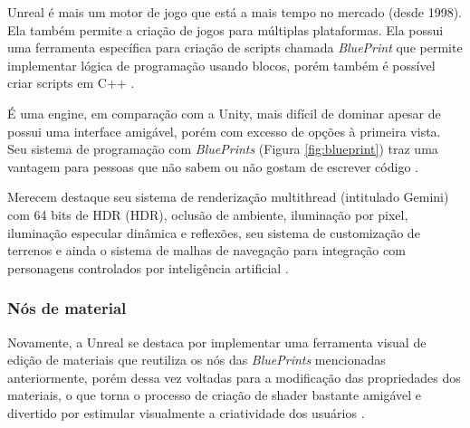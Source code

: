 Unreal é mais um motor de jogo que está a mais tempo no mercado (desde 1998). Ela também permite a criação de jogos para múltiplas plataformas. Ela possui uma ferramenta específica para criação de scripts chamada \textit{BluePrint} que permite implementar lógica de programação usando blocos, porém também é possível criar scripts em C++ \cite{compStudyGE}.

\begin{figure}[h!]
	\centering
\end{figure}
\nocite{blueprint}

É uma engine, em comparação com a Unity, mais difícil de dominar apesar de possui uma interface amigável, porém com excesso de opções à primeira vista. Seu sistema de programação com \textit{BluePrints} (Figura \ref{fig:blueprint}) traz uma vantagem para pessoas que não sabem ou não gostam de escrever código \cite{compStudyGE}.

Merecem destaque seu sistema de renderização \Gls{multithread} (intitulado Gemini) com 64 bits de HDR (\acrlong{HDR}), oclusão de ambiente, iluminação por pixel, iluminação especular dinâmica e reflexões, seu sistema de customização de terrenos e ainda o sistema de malhas de navegação para integração com personagens controlados por inteligência artificial \cite{armstrong2013game}.
 
\subsubsection{Nós de material}
\label{sec:material-nodes}

Novamente, a Unreal se destaca por implementar uma ferramenta visual de edição de materiais que reutiliza os nós das \textit{BluePrints} mencionadas anteriormente, porém dessa vez voltadas para a modificação das propriedades dos materiais, o que torna o processo de criação de shader bastante amigável e divertido por estimular visualmente a criatividade dos usuários \cite{compStudyGE}. 

